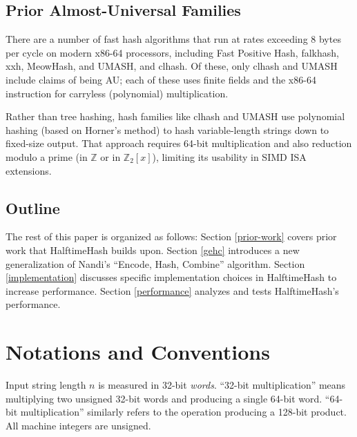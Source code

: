 \documentclass[runningheads]{llncs}
\newcommand{\ints}{\mathbb{Z}}
\begin{document}

\subsection{Prior Almost-Universal Families}

There are a number of fast hash algorithms that run at rates exceeding 8 bytes per cycle on modern x86-64 processors, including Fast Positive Hash, falk\-hash, xxh, Meow\-Hash, and UMASH, and cl\-hash. \cite{smhasher}
Of these, only cl\-hash and U\-MASH include claims of being AU; each of these uses finite fields and the x86-64 instruction for carryless (polynomial) multiplication.

Rather than tree hashing, hash families like clhash and UMASH use polynomial hashing (based on Horner's method) to hash variable-length strings down to fixed-size output.
That approach requires 64-bit multiplication and also reduction modulo a prime (in $\ints$ or in $\ints_2[x]$), limiting its usability in SIMD ISA extensions.



\subsection{Outline}

The rest of this paper is organized as follows: Section \ref{prior-work} covers prior work that HalftimeHash builds upon.
Section \ref{gehc} introduces a new generalization of Nandi's ``Encode, Hash, Combine'' algorithm.\cite{ehc-nandi}
Section \ref{implementation} discusses specific implementation choices in HalftimeHash to increase performance.
Section \ref{performance} analyzes and tests HalftimeHash's performance.

\section{Notations and Conventions}

Input string length $n$ is measured in 32-bit {\em words}.
``32-bit multiplication'' means multiplying two unsigned 32-bit words and producing a single 64-bit word.
``64-bit multiplication'' similarly refers to the operation producing a 128-bit product.
All machine integers are unsigned.
\end{document}

